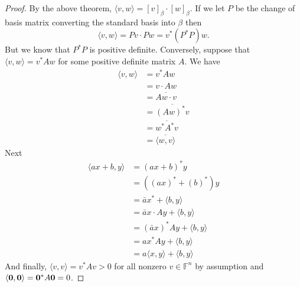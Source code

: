 \documentclass[oneside, 12pt]{book}
\theoremstyle{definition}
\begin{document}
\begin{proof}
  By the above theorem, $\langle v , w \rangle= [v]_{\beta} \cdot [w]_{\beta}$. If we let $P$ be the change of basis matrix converting the standard basis into $\beta$ then \[\langle v , w\rangle = Pv \cdot Pw=v^{*}(P^{*}P)w.\] But we know that $P^{*}P$ is positive definite.
  Conversely, suppose that $\langle v, w \rangle = v^{*}Aw$ for some positive definite matrix $A$. We have
  \begin{align}
    \langle v , w \rangle &= v^{*}Aw \\
              &= v \cdot Aw \\
              &= \overline{Aw \cdot v} \\
              &= \overline{(Aw)^{*}v} \\
              &= \overline{w^{*}A^{*}v} \\
              &= \overline{\langle w , v \rangle}
  \end{align}
  Next
  \begin{align}
    \langle ax+b, y \rangle &= (ax+b)^{*}y \\
                &= ((ax)^{*}+ (b)^{*})y \\
                &= \bar{a}x^{*} + \langle b , y \rangle \\
                &= \bar{a}x \cdot Ay + \langle b , y \rangle \\
                &= (\bar{a}x)^{*}Ay + \langle b , y \rangle \\
                &= ax^{*}Ay + \langle b , y \rangle \\
                &=a \langle x, y \rangle + \langle b , y \rangle
  \end{align}
And finally, $\langle v , v \rangle=v^{*}Av>0$ for all nonzero $v \in \mathbb{F}^{n}$ by assumption and $\langle \bold{0}, \bold{0} \rangle=\bold{0}^{*}A\bold{0}=0$.
\end{proof}
\end{document}
